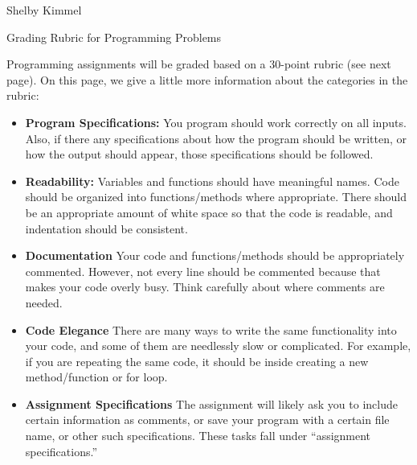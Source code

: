 \documentclass[11pt,landscape]{article}
\begin{document}
\hfill Shelby Kimmel

\begin{center}
{\huge Grading Rubric for Programming Problems}
\end{center}
\bigskip

Programming assignments will be graded based on a 30-point rubric (see next page). On this page, we give a little more information about the categories in the rubric:

\begin{itemize}
\item \textbf{Program Specifications:} You program should work correctly on all inputs. Also, if there any specifications about how the program should be written, or how the output should appear, those specifications should be followed.

\item \textbf{Readability:} Variables and functions should have meaningful names. Code should be organized into functions/methods where appropriate. There should be an appropriate amount of white space so that the code is readable, and indentation should be consistent.

\item \textbf{Documentation} Your code and functions/methods should be appropriately commented. However, not every line should be commented because that makes your code overly busy. Think carefully about where comments are needed. 

\item \textbf{Code Elegance} There are many ways to write the same functionality into your code, and some of them are needlessly slow or complicated. For example, if you are repeating the same code, it should be inside  creating a new method/function or for loop.

\item \textbf{Assignment Specifications} The assignment will likely ask you to include certain information as comments, or save your program with a certain file name, or other such specifications. These tasks fall under ``assignment specifications.''
\end{itemize}
\end{document}
